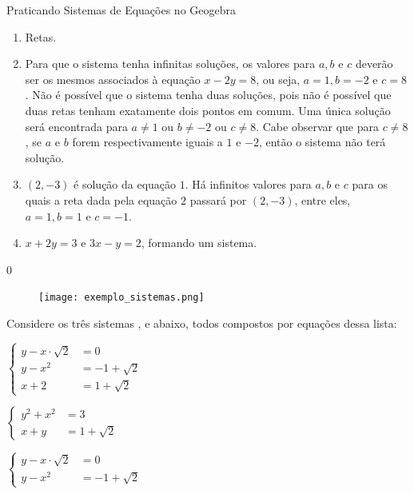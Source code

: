 \begin{answer}{Praticando Sistemas de Equações no Geogebra}
{
\begin{enumerate}
\item Retas.
\item Para que o sistema tenha infinitas soluções, os valores para $a, b$ e $c$ deverão ser os mesmos associados à equação $x-2y=8$, ou seja, $a=1, b=-2$ e $c=8$. Não é possível que o sistema tenha duas soluções, pois não é possível que duas retas tenham exatamente  dois pontos em comum. Uma única solução será encontrada para $a\neq 1$ ou $b \neq -2$ ou $c \neq 8$. Cabe observar que para $c \neq 8$, se $a$ e $b$ forem respectivamente iguais a $1$ e $-2$, então o sistema não terá solução.
\item $(2,-3)$ é solução da equação $1$. Há infinitos valores para $a, b$ e $c$ para os quais a reta dada pela equação $2$ passará por $(2,-3)$, entre eles, $a=1, b=1$ e $c=-1$.
\item $x+2y=3$ e $3x-y=2$, formando um sistema.
\end{enumerate}
}{0}
\end{answer}

\def\currentcolor{session4}

\begin{figure}[H]
\centering

\noindent\texttt{[image: exemplo\_sistemas.png]}
\end{figure}

Considere os três sistemas ,  e  abaixo, todos compostos por equações dessa lista:



\begin{enumerate}[label=\titem{(\Roman*)}]
\small
\begin{minipage}{.33\linewidth}
\null\vfill
\item 
$
\left\{
\begin{aligned}
y-x\cdot\sqrt{2}&=0\\
y-x^2&=-1+\sqrt{2}\\
x+2&=1+\sqrt{2}
\end{aligned}
\right.
$
\vfill\null
\end{minipage}
\begin{minipage}{.33\linewidth}
\null\vfill
\item 
$
\left\{
\begin{aligned}
y^2+x^2&=3\\
x+y&=1+\sqrt{2}
\end{aligned}
\right.
$
\vfill\null
\end{minipage}
\begin{minipage}{.33\linewidth}
\null\vfill
\item 
$
\left\{
\begin{aligned}
y-x\cdot\sqrt{2}&=0\\
y-x^2&=-1+\sqrt{2}
\end{aligned}
\right.
$
\vfill\null
\end{minipage}
\end{enumerate}

